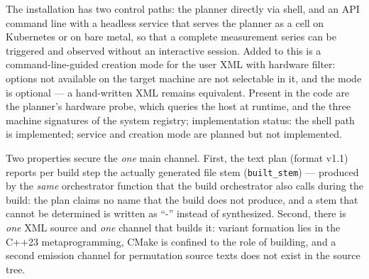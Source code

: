 \begin{nurlang}
The installation has two control paths: the planner directly via shell, and an API command line with a
headless service that serves the planner as a cell on Kubernetes or on bare metal, so that a complete
measurement series can be triggered and observed without an interactive session. Added to this is a
command-line-guided creation mode for the user XML with hardware filter: options not available on the
target machine are not selectable in it, and the mode is optional --- a hand-written XML remains
equivalent. Present in the code are the planner's hardware probe, which queries the host at runtime,
and the three machine signatures of the system registry; implementation status: the shell path is
implemented; service and creation mode are planned but not implemented.

Two properties secure the \emph{one} main channel. First, the text plan (format v1.1) reports per build
step the actually generated file stem (\texttt{built\_stem}) --- produced by the \emph{same}
orchestrator function that the build orchestrator also calls during the build: the plan claims no name
that the build does not produce, and a stem that cannot be determined is written as \enquote{-} instead
of synthesized. Second, there is \emph{one} XML source and \emph{one} channel that builds it: variant
formation lies in the C++23 metaprogramming, CMake is confined to the role of building, and a second
emission channel for permutation source texts does not exist in the source tree.


\end{nurlang}
